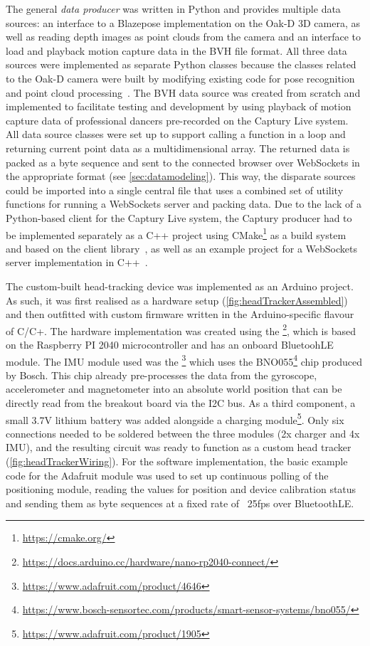 The general \emph{data producer} was written in Python and provides multiple data sources: an interface to a Blazepose implementation on the Oak-D \ac{3D} camera, as well as reading depth images as point clouds from the camera and an interface to load and playback motion capture data in the \ac{BVH} file format.
All three data sources were implemented as separate Python classes because the classes related to the Oak-D camera were built by modifying existing code for pose recognition~\parencite{githubDepthAiBlazePose} and point cloud processing~\parencite{githubDepthAiPointcloud}.
The \ac{BVH} data source was created from scratch and implemented to facilitate testing and development by using playback of motion capture data of professional dancers pre-recorded on the Captury Live system.
All data source classes were set up to support calling a function in a loop and returning current point data as a multidimensional array.
The returned data is packed as a byte sequence and sent to the connected browser over WebSockets in the appropriate format (see \autoref{sec:datamodeling}).
This way, the disparate sources could be imported into a single central file that uses a combined set of utility functions for running a WebSockets server and packing data.
Due to the lack of a Python-based client for the Captury Live system, the Captury producer had to be implemented separately as a C++ project using CMake\footnote{\url{https://cmake.org/}} as a build system and based on the  client library~\parencite{githubRemoteCaptury}, as well as an example project for a WebSockets server implementation in C++~\parencite{githubCppWebSocketsDemo}.

The custom-built head-tracking device was implemented as an Arduino project.
As such, it was first realised as a hardware setup (\autoref{fig:headTrackerAssembled}) and then outfitted with custom firmware written in the Arduino-specific flavour of C/C+.
The hardware implementation was created using the \footnote{\url{https://docs.arduino.cc/hardware/nano-rp2040-connect/}}, which is based on the Raspberry PI 2040 microcontroller and has an onboard BluetoohLE module.
The \ac{IMU} module used was the \footnote{\url{https://www.adafruit.com/product/4646}} which uses the BNO055\footnote{\url{https://www.bosch-sensortec.com/products/smart-sensor-systems/bno055/}} chip produced by Bosch.
This chip already pre-processes the data from the gyroscope, accelerometer and magnetometer into an absolute world position that can be directly read from the breakout board via the \ac{I2C} bus.
As a third component, a small 3.7V lithium battery was added alongside a charging module\footnote{\url{https://www.adafruit.com/product/1905}}.
Only six connections needed to be soldered between the three modules (2x charger and 4x \ac{IMU}), and the resulting circuit was ready to function as a custom head tracker (\autoref{fig:headTrackerWiring}).
For the software implementation, the basic example code for the Adafruit module was used to set up continuous polling of the positioning module, reading the values for position and device calibration status and sending them as byte sequences at a fixed rate of ~25fps over BluetoothLE\@.

